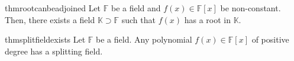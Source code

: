 \begin{restatable}[]{thm}{rootcanbeadjoined}
\label{thm:rootcanbeadjoined}
    Let $\mathbb{F}$ be a field and $f(x) \in \mathbb{F}[x]$ be non-constant. Then, there exists a field $\mathbb{K} \supset \mathbb{F}$ such that $f(x)$ has a root in $\mathbb{K}.$ \hfill\hyperref[thm:rootcanbeadjoined2]{\downsym}
\end{restatable}

\begin{restatable}{thm}{splitfieldexists}
\label{thm:splitfieldexists}
    Let $\mathbb{F}$ be a field. Any polynomial $f(x) \in \mathbb{F}[x]$ of positive degree has a splitting field. \hfill\hyperref[thm:splitfieldexists2]{\downsym}
\end{restatable}